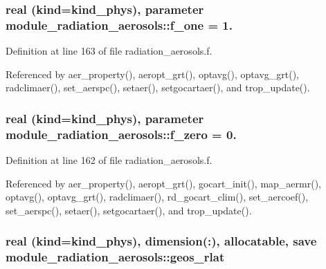 \subsubsection[{\texorpdfstring{f\+\_\+one}{f_one}}]{\setlength{\rightskip}{0pt plus 5cm}real (kind=kind\+\_\+phys), parameter module\+\_\+radiation\+\_\+aerosols\+::f\+\_\+one = 1.\hspace{0.3cm}{\ttfamily [private]}}\hypertarget{group__module__radiation__aerosols_ga63babe7f9ec4ff6a0364993f4be3768e}{}\label{group__module__radiation__aerosols_ga63babe7f9ec4ff6a0364993f4be3768e}


Definition at line 163 of file radiation\+\_\+aerosols.\+f.



Referenced by aer\+\_\+property(), aeropt\+\_\+grt(), optavg(), optavg\+\_\+grt(), radclimaer(), set\+\_\+aerspc(), setaer(), setgocartaer(), and trop\+\_\+update().

\subsubsection[{\texorpdfstring{f\+\_\+zero}{f_zero}}]{\setlength{\rightskip}{0pt plus 5cm}real (kind=kind\+\_\+phys), parameter module\+\_\+radiation\+\_\+aerosols\+::f\+\_\+zero = 0.\hspace{0.3cm}{\ttfamily [private]}}\hypertarget{group__module__radiation__aerosols_ga7db1adcf476a9a5532230aa11fcc3bb7}{}\label{group__module__radiation__aerosols_ga7db1adcf476a9a5532230aa11fcc3bb7}


Definition at line 162 of file radiation\+\_\+aerosols.\+f.



Referenced by aer\+\_\+property(), aeropt\+\_\+grt(), gocart\+\_\+init(), map\+\_\+aermr(), optavg(), optavg\+\_\+grt(), radclimaer(), rd\+\_\+gocart\+\_\+clim(), set\+\_\+aercoef(), set\+\_\+aerspc(), setaer(), setgocartaer(), and trop\+\_\+update().

\subsubsection[{\texorpdfstring{geos\+\_\+rlat}{geos_rlat}}]{\setlength{\rightskip}{0pt plus 5cm}real (kind=kind\+\_\+phys), dimension(\+:), allocatable, save module\+\_\+radiation\+\_\+aerosols\+::geos\+\_\+rlat\hspace{0.3cm}{\ttfamily [private]}}\hypertarget{group__module__radiation__aerosols_gaef43bfbd28ef9b87e8d6973ba7331a18}{}\label{group__module__radiation__aerosols_gaef43bfbd28ef9b87e8d6973ba7331a18}


